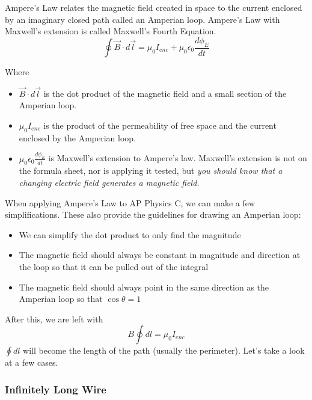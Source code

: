 \documentclass[12pt, titlepage]{article}
\begin{document}
Ampere's Law relates the magnetic field created in space to the current enclosed by an imaginary closed path called an Amperian loop. Ampere's Law with Maxwell's extension is called Maxwell's Fourth Equation.
\begin{equation*}
    \oint \vec{B} \cdot d\vec{l}= \mu_0I_{enc} + \mu_0\epsilon_0\frac{d\phi_E}{dt}
\end{equation*}
\begin{minipage}{\textwidth}
Where
\begin{itemize}
    \item $\vec{B} \cdot d\vec{l}$ is the dot product of the magnetic field and a small section of the Amperian loop.
    \item $\mu_0I_{enc}$ is the product of the permeability of free space and the current enclosed by the Amperian loop.
    \item $\mu_0\epsilon_0\frac{d\phi_E}{dt}$ is Maxwell's extension to Ampere's law. Maxwell's extension is not on the formula sheet, nor is applying it tested, but \textit{you should know that a changing electric field generates a magnetic field.}
\end{itemize}
\end{minipage}

When applying Ampere's Law to AP Physics C, we can make a few simplifications. These also provide the guidelines for drawing an Amperian loop:
\begin{itemize}
    \item We can simplify the dot product to only find the magnitude
    \item The magnetic field should always be constant in magnitude and direction at the loop so that it can be pulled out of the integral
    \item The magnetic field should always point in the same direction as the Amperian loop so that $\cos\theta=1$
\end{itemize}
After this, we are left with 
\begin{equation*}
    B \oint dl = \mu_0I_{enc}
\end{equation*}
$\oint dl$ will become the length of the path (usually the perimeter). Let's take a look at a few cases.

\subsubsection*{Infinitely Long Wire}
\end{document}
